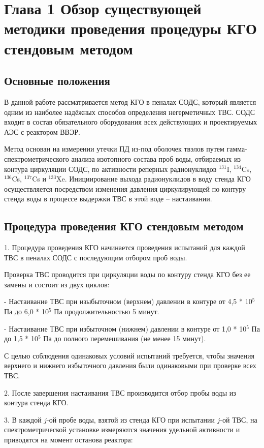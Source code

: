 
\section{Глава 1 Обзор существующей методики проведения процедуры КГО стендовым методом}

\subsection{Основные положения}

В данной работе рассматривается метод КГО в пеналах СОДС, который является одним из наиболее надёжных
способов определения негерметичных ТВС. СОДС входит в состав обязательного оборудования всех действующих и проектируемых АЭС с реактором ВВЭР.

Метод основан на измерении утечки ПД из-под оболочек твэлов путем гамма-спектрометрического анализа изотопного состава проб воды, отбираемых из контура циркуляции СОДС, по активности реперных радионуклидов $^{131}$I, $^{134}$Cs, $^{136}$Cs, $^{137}$Cs и $^{133}$Xe. Инициирование выхода радионуклидов в воду стенда КГО осуществляется посредством изменения давления циркулирующей по контуру стенда воды в процессе выдержки ТВС в этой воде -- настаивании.


\subsection{Процедура проведения КГО стендовым методом}
1. Процедура проведения КГО начинается проведения испытаний для каждой ТВС в пеналах СОДС с последующим отбором проб воды. 

Проверка ТВС проводится при циркуляции воды по контуру стенда КГО без ее замены и состоит из двух циклов:

- Настаивание ТВС при изыбыточном (верхнем) давлении в контуре от 4,5 * 10$^{5}$ Па до 6,0 * 10$^{5}$ Па продолжительностью 5 минут.

- Настаивание ТВС при избыточном (нижнем) давлении в контуре от 1,0 * 10$^{5}$ Па до 1,5 * 10$^{5}$ Па до полного перемешивания (не менее 15 минут).

С целью соблюдения одинаковых условий испытаний требуется, чтобы значения верхнего и нижнего избыточного давления были одинаковыми при проверке всех ТВС. 

2. После завершения настаивания ТВС производится отбор пробы воды из контура стенда КГО.

3. В каждой $j$-ой пробе воды, взятой из стенда КГО при испытании $j$-ой ТВС, на спектрометрической установке измеряются значения удельной активности и приводятся на момент останова реактора:

